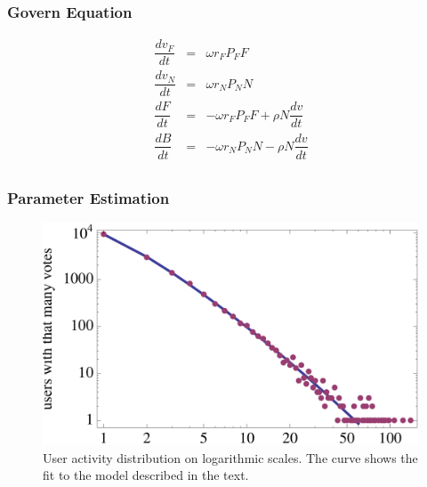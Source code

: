 \documentclass[aspectratio=43]{beamer}
\begin{document}
\begin{frame}
\frametitle{Govern Equation}
\begin{minipage}{\textwidth}
\begin{block}{}
  \begin{equation}
	\begin{array}{lcr}
    \dfrac{dv_F}{dt} & = & \omega{}r_F{}P_F{}F\\
    \dfrac{dv_N}{dt} & = & \omega{}r_N{}P_N{}N\\
    \dfrac{dF}{dt} & = & -\omega{}r_F{}P_F{}F + \rho N \dfrac{dv}{dt}\\
    \dfrac{dB}{dt} & = & -\omega{}r_N{}P_N{}N - \rho N \dfrac{dv}{dt}\\
    \end{array}
  \end{equation}
\end{block}
\end{minipage}
\end{frame}

\begin{frame}
\frametitle{Parameter Estimation}
\begin{minipage}{\textwidth}
\begin{figure}
\centering
\includegraphics[height=0.7\textheight]{fig06.PNG}
\caption{User activity distribution on logarithmic scales. The curve
shows the fit to the model described in the text.}
\end{figure}
\end{minipage}
\end{frame}
\end{document}
